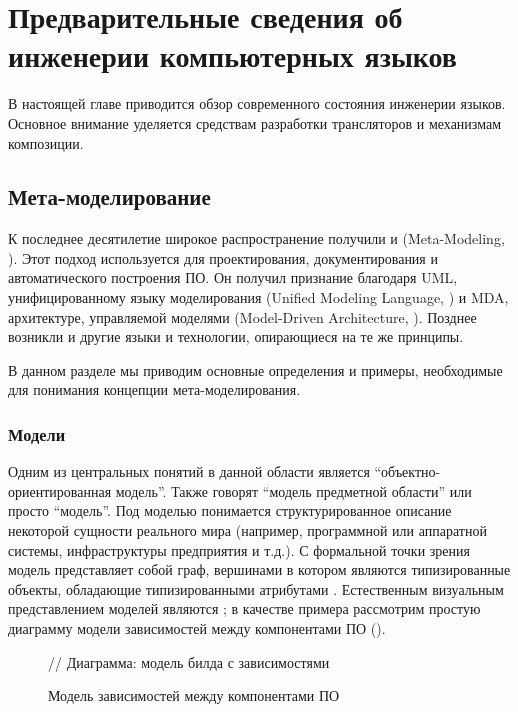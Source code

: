 \part{Предварительные сведения об инженерии компьютерных языков}\label{part1}

В настоящей главе приводится обзор современного состояния инженерии языков. Основное внимание уделяется средствам разработки трансляторов и механизмам композиции.

\chapter{Мета-моделирование}

К последнее десятилетие широкое распространение получили  и  (Meta-Modeling, \cite{MetaModeling}). Этот подход используется для проектирования, документирования и автоматического построения ПО. Он получил признание благодаря UML, унифицированному языку моделирования (Unified Modeling Language, \cite{UML}) и MDA, архитектуре, управляемой моделями (Model-Driven Architecture, \cite{MDA}).
Позднее возникли и другие языки и технологии, опирающиеся на те же принципы.

В данном разделе мы приводим основные определения и примеры, необходимые для понимания концепции мета-моделирования. 

\section{Модели}

Одним из центральных понятий в данной области является ``объектно-ориентированная модель''.  Также говорят ``модель предметной области'' или просто ``модель''. Под моделью понимается структурированное описание некоторой сущности реального мира (например, программной или аппаратной системы, инфраструктуры предприятия и т.д.). С формальной точки зрения модель представляет собой граф, вершинами в котором являются типизированные объекты, обладающие типизированными атрибутами \cite{KM3}. Естественным визуальным представлением моделей являются ; в качестве примера рассмотрим простую диаграмму модели зависимостей между компонентами ПО ().

\begin{figure}[htbp]
// Диаграмма: модель билда с зависимостями
\caption{Модель зависимостей между компонентами ПО}\label{DiagramExample}
\end{figure}

